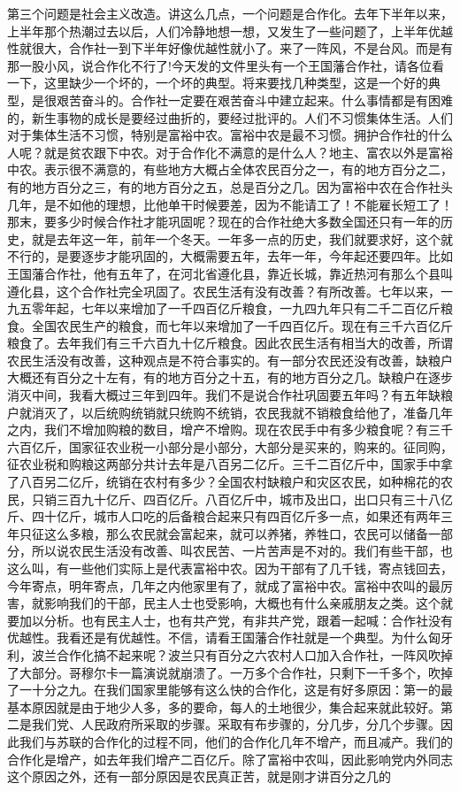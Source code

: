 第三个问题是社会主义改造。讲这么几点，一个问题是合作化。去年下半年以来，上半年那个热潮过去以后，人们冷静地想一想，又发生了一些问题了，上半年优越性就很大，合作社一到下半年好像优越性就小了。来了一阵风，不是台风。而是有那一股小风，说合作化不行了!今天发的文件里头有一个王国藩合作社，请各位看一下，这里缺少一个坏的，一个坏的典型。将来要找几种类型，这是一个好的典型，是很艰苦奋斗的。合作社一定要在艰苦奋斗中建立起来。什么事情都是有困难的，新生事物的成长是要经过曲折的，要经过批评的。人们不习惯集体生活。人们对于集体生活不习惯，特别是富裕中农。富裕中农是最不习惯。拥护合作社的什么人呢？就是贫农跟下中农。对于合作化不满意的是什么人？地主、富农以外是富裕中农。表示很不满意的，有些地方大概占全体农民百分之一，有的地方百分之二，有的地方百分之三，有的地方百分之五，总是百分之几。因为富裕中农在合作社头几年，是不如他的理想，比他单干时候要差，因为不能请工了！不能雇长短工了！那末，要多少时候合作社才能巩固呢？现在的合作社绝大多数全国还只有一年的历史，就是去年这一年，前年一个冬天。一年多一点的历史，我们就要求好，这个就不行的，是要逐步才能巩固的，大概需要五年，去年一年，今年起还要四年。比如王国藩合作社，他有五年了，在河北省遵化县，靠近长城，靠近热河有那么个县叫遵化县，这个合作社完全巩固了。农民生活有没有改善？有所改善。七年以来，一九五零年起，七年以来增加了一千四百亿斤粮食，一九四九年只有二千二百亿斤粮食。全国农民生产的粮食，而七年以来增加了一千四百亿斤。现在有三千六百亿斤粮食了。去年我们有三千六百九十亿斤粮食。因此农民生活有相当大的改善，所谓农民生活没有改善，这种观点是不符合事实的。有一部分农民还没有改善，缺粮户大概还有百分之十左有，有的地方百分之十五，有的地方百分之几。缺粮户在逐步消灭中间，我看大概过三年到四年。我们不是说合作社巩固要五年吗？有五年缺粮户就消灭了，以后统购统销就只统购不统销，农民我就不销粮食给他了，准备几年之内，我们不增加购粮的数目，增产不增购。现在农民手中有多少粮食呢？有三千六百亿斤，国家征农业税一小部分是小部分，大部分是买来的，购来的。征同购，征农业税和购粮这两部分共计去年是八百另二亿斤。三千二百亿斤中，国家手中拿了八百另二亿斤，统销在农村有多少？全国农村缺粮户和灾区农民，如种棉花的农民，只销三百九十亿斤、四百亿斤。八百亿斤中，城市及出口，出口只有三十八亿斤、四十亿斤，城市人口吃的后备粮合起来只有四百亿斤多一点，如果还有两年三年只征这么多粮，那么农民就会富起来，就可以养猪，养牲口，农民可以储备一部分，所以说农民生活没有改善、叫农民苦、一片苦声是不对的。我们有些干部，也这么叫，有一些他们实际上是代表富裕中农。因为干部有了几千钱，寄点钱回去，今年寄点，明年寄点，几年之内他家里有了，就成了富裕中农。富裕中农叫的最厉害，就影响我们的干部，民主人士也受影响，大概也有什么亲戚朋友之类。这个就要加以分析。也有民主人士，也有共产党，有非共产党，跟着一起喊：合作社没有优越性。我看还是有优越性。不信，请看王国藩合作社就是一个典型。为什么匈牙利，波兰合作化搞不起来呢？波兰只有百分之六农村人口加入合作社，一阵风吹掉了大部分。哥穆尔卡一篇演说就崩溃了。一万多个合作社，只剩下一千多个，吹掉了一十分之九。在我们国家里能够有这么快的合作化，这是有好多原因：第一的最基本原因就是由于地少人多，多的要命，每人的土地很少，集合起来就此较好。第二是我们党、人民政府所采取的步骤。采取有布步骤的，分几步，分几个步骤。因此我们与苏联的合作化的过程不同，他们的合作化几年不增产，而且减产。我们的合作化是增产，如去年我们增产二百亿斤。除了富裕中农叫，因此影响党内外同志这个原因之外，还有一部分原因是农民真正苦，就是刚才讲百分之几的